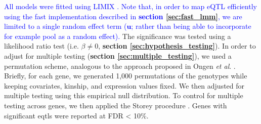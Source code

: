 \textcolor{blue}{All models were fitted using LIMIX \cite{lippert2014limix, casale2015efficient}. 
Note that, in order to map eQTL efficiently using the fast implementation described in \textbf{section \ref{sec:fast_lmm}}, we are limited to a single random effect term ($\mathbf{u}$; rather than being able to incorporate for example pool as a random effect).}
The significance was tested using a likelihood ratio test (i.e. $\beta \neq 0$, \textbf{section 
\ref{sec:hypothesis_testing}}).
In order to adjust for multiple testing (\textbf{section
\ref{sec:multiple_testing}}),
we used a permutation scheme, analogous to the approach proposed in Ongen \textit{et al}. \cite{ongen2016fast}. 
Briefly, for each gene, we generated 1,000 permutations of the genotypes while keeping covariates, kinship, and expression values fixed. 
We then adjusted for multiple testing using this empirical null distribution.
To control for multiple testing across genes, we then applied the Storey procedure \cite{storey2003statistical}. 
Genes with significant \glspl{eqtl} were reported at FDR < 10\%.

